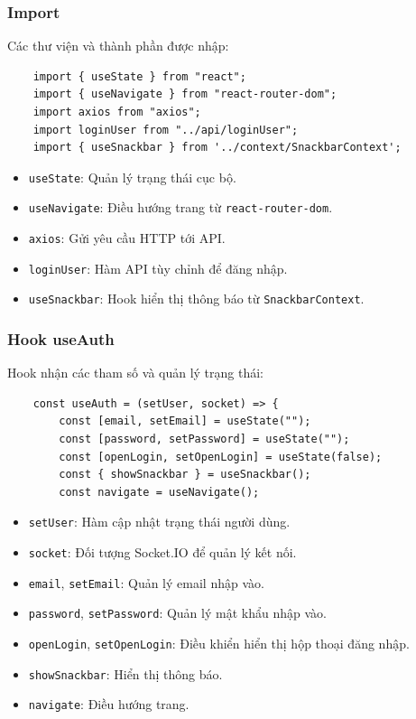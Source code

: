             \subsubsection{Import}
                \hspace*{0.6cm}Các thư viện và thành phần được nhập:
                \begin{lstlisting}
    import { useState } from "react";
    import { useNavigate } from "react-router-dom";
    import axios from "axios";
    import loginUser from "../api/loginUser";
    import { useSnackbar } from '../context/SnackbarContext';
                \end{lstlisting}
                \begin{itemize}
                    \item \texttt{useState}: Quản lý trạng thái cục bộ.
                    \item \texttt{useNavigate}: Điều hướng trang từ \texttt{react-router-dom}.
                    \item \texttt{axios}: Gửi yêu cầu HTTP tới API.
                    \item \texttt{loginUser}: Hàm API tùy chỉnh để đăng nhập.
                    \item \texttt{useSnackbar}: Hook hiển thị thông báo từ \texttt{SnackbarContext}.
                \end{itemize}

            \subsubsection{Hook useAuth}
                \hspace*{0.6cm}Hook nhận các tham số và quản lý trạng thái:
                \begin{lstlisting}
    const useAuth = (setUser, socket) => {
        const [email, setEmail] = useState("");
        const [password, setPassword] = useState("");
        const [openLogin, setOpenLogin] = useState(false);
        const { showSnackbar } = useSnackbar();
        const navigate = useNavigate();
                \end{lstlisting}
                \begin{itemize}
                    \item \texttt{setUser}: Hàm cập nhật trạng thái người dùng.
                    \item \texttt{socket}: Đối tượng Socket.IO để quản lý kết nối.
                    \item \texttt{email}, \texttt{setEmail}: Quản lý email nhập vào.
                    \item \texttt{password}, \texttt{setPassword}: Quản lý mật khẩu nhập vào.
                    \item \texttt{openLogin}, \texttt{setOpenLogin}: Điều khiển hiển thị hộp thoại đăng nhập.
                    \item \texttt{showSnackbar}: Hiển thị thông báo.
                    \item \texttt{navigate}: Điều hướng trang.
                \end{itemize}

